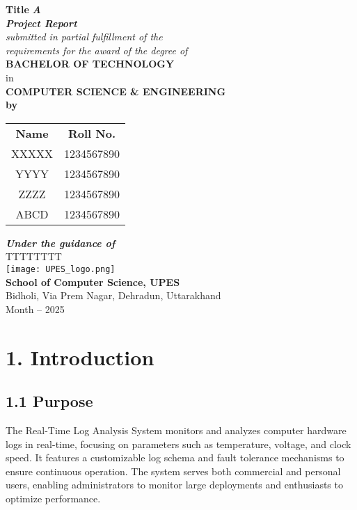 \documentclass[a4paper,12pt]{report}
\begin{document}
\begin{titlepage}
    \centering
    \vspace*{1cm}
    \Huge
    \textbf{Title}
    \vfill
    \LARGE
    \textbf{\textit{A\\
    Project Report}}\\
    \textit{submitted in partial fulfillment of the\\
    requirements for the award of the degree of}\\
    \vfill
    \textbf{BACHELOR OF TECHNOLOGY}\\
    in\\
    \textbf{COMPUTER SCIENCE \& ENGINEERING}\\
    \vfill
    \textbf{by}\\
    \large
 \begin{tabular}{c c}
        \textbf{Name} & \textbf{Roll No.} \\ 
        XXXXX  & 1234567890 \\
        YYYY   & 1234567890 \\
        ZZZZ   & 1234567890 \\
        ABCD   & 1234567890 \\
\end{tabular}
    
    \vfill
    \textbf{\textit{Under the guidance of}}\\
    TTTTTTTT\\
    \vfill
    \texttt{[image: UPES\_logo.png]}\\
    \vfill
    \textbf{School of Computer Science, UPES}\\
     Bidholi, Via Prem Nagar, Dehradun, Uttarakhand\\
    Month -- 2025
\end{titlepage}

\tableofcontents

\section{1. Introduction}

\subsection{1.1 Purpose}
The Real-Time Log Analysis System monitors and analyzes computer hardware logs in real-time, focusing on parameters such as temperature, voltage, and clock speed. It features a customizable log schema and fault tolerance mechanisms to ensure continuous operation. The system serves both commercial and personal users, enabling administrators to monitor large deployments and enthusiasts to optimize performance.
\end{document}
